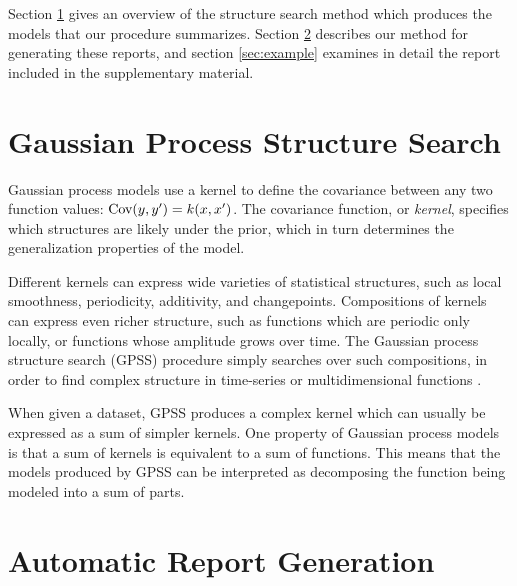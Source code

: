 \documentclass{article} %
\begin{document}
Section \ref{sec:gpss} gives an overview of the structure search method which produces the models that our procedure summarizes.  Section \ref{sec:method} describes our method for generating these reports, and section \ref{sec:example} examines in detail the report included in the supplementary material.


\section{Gaussian Process Structure Search}
\label{sec:gpss}

Gaussian process models\cite{rasmussen38gaussian} use a kernel to define the covariance between any two function values: ${\textrm{Cov}(y, y') = k(x,x')}$.
The covariance function, or \emph{kernel}, specifies which structures are likely under the \gp{} prior, which in turn determines the generalization properties of the model.

Different kernels can express wide varieties of statistical structures, such as local smoothness, periodicity, additivity, and changepoints.  Compositions of kernels can express even richer structure, such as functions which are periodic only locally, or functions whose amplitude grows over time.  The Gaussian process structure search (GPSS) procedure simply searches over such compositions, in order to find complex structure in time-series or multidimensional functions \cite{DuvLloGroetal13}.

When given a dataset, GPSS produces a complex kernel which can usually be expressed as a sum of simpler kernels.  One property of Gaussian process models is that a sum of kernels is equivalent to a sum of functions.  This means that the models produced by GPSS can be interpreted as decomposing the function being modeled into a sum of parts.


\section{Automatic Report Generation}
\label{sec:method}
\end{document}
